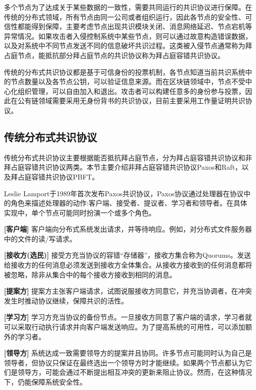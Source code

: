 多个节点为了达成关于某些数据的一致性，需要共同运行的共识协议进行保障。在传统的分布式领域，所有节点由同一公司或者组织运行，因此各节点的安全性、可信性都能得到保障，主要考虑节点出现共识模块关闭、消息网络延迟、节点宕机等异常情况。如果攻击者入侵控制系统中某些节点，则可以通过故意构造错误数据，以及对系统中不同节点发送不同的信息破坏共识过程。这类被入侵节点通常称为拜占庭节点，能抵抗部分拜占庭节点的共识协议称为拜占庭容错共识协议。

传统的分布式共识协议都是基于可信身份的投票机制，各节点知道当前共识系统中的节点数量以及各节点公钥，可以验证信息来源。而在区块链领域中，节点不受中心化组织管理，可以自由加入和退出。攻击者可以构建任意多的身份参与投票，因此在公有链领域需要采用无身份背书的共识协议，目前主要采用工作量证明共识协议。

\subsection{传统分布式共识协议}
\label{subsec:traditional-consensus}

传统分布式共识协议主要根据能否抵抗拜占庭节点，分为拜占庭容错共识协议和非拜占庭容错共识协议两类。本节主要介绍非拜占庭容错共识协议Paxos和Raft，以及拜占庭容错共识协议PBFT。

Leslie Lamport于1989年首次发布Paxos共识协议，Paxos协议通过处理器在协议中的角色来描述处理器的动作:客户端、接受者、提议者、学习者和领导者。在具体实现中，单个节点可能同时扮演一个或多个角色。

\begin{description}
  \item \textbf{[客户端]} 客户端向分布式系统发出请求，并等待响应。例如，对分布式文件服务器中的文件的读/写请求。
  \item \textbf{[接收方(选民)]} 接受方充当协议的容错“存储器”，接收方集合称为Quorums。发送给接收方的任何消息必须发送到接收方全体集合。从接收方接收到的任何消息都将被忽略，除非从集合中的每个接收方接收到相同的消息。
  \item \textbf{[提案方]} 提案方主张客户端请求，试图说服接收方同意它，并充当协调者，在冲突发生时推动协议继续，保障共识的活性。
  \item \textbf{[学习方]} 学习方充当协议的备份节点。一旦接收方同意了客户端的请求，学习者就可以采取行动执行请求并向客户端发送响应。为了提高系统的可用性，可以添加额外的学习者。
  \item \textbf{[领导方]} 系统达成一致需要领导方的提案并且协同。许多节点可能同时认为自己是领导者，但协议只保证在最终选出一个领导方时才能继续。如果两个节点都认为它们是领导方，可能会通过不断提出相互冲突的更新来阻止协议。然而，在这种情况下，仍能保障系统安全性。
\end{description}

